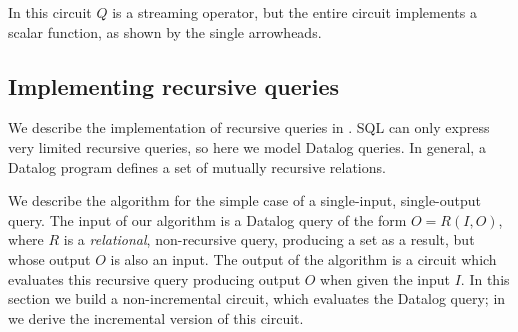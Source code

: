 In this circuit $Q$ is a streaming operator, but the entire circuit
implements a scalar function, as shown by the single arrowheads.


\subsection{Implementing recursive queries}\label{sec:datalog}

We describe the implementation of recursive queries in \dbsp.  SQL can
only express very limited recursive queries, so here we model Datalog
queries.  In general, a Datalog program defines a set of mutually
recursive relations.

We describe the algorithm for the simple case of a single-input,
single-output query.  The input of our algorithm is a Datalog query of
the form $O = R(I, O)$, where $R$ is a \emph{relational},
non-recursive query, producing a set as a result, but whose output $O$
is also an input.  The output of the algorithm is a \dbsp circuit
which evaluates this recursive query producing output $O$ when given
the input $I$.  In this section we build a non-incremental circuit,
which evaluates the Datalog query; in  we derive
the incremental version of this circuit.

